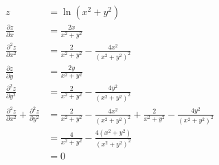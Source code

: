 \documentclass{article}
\begin{document}
\begin{align*}
  z                                                                     & = \ln (x^2 + y^2)                                                                                       \\
  \frac{\partial z}{\partial x}                                         & = \frac{2 x}{x^2 + y^2}                                                                                 \\
  \frac{\partial^2 z}{\partial x^2}                                     & = \frac{2}{x^2 + y^2} - \frac{4 x^2}{(x^2 + y^2)^2}                                                     \\
  \frac{\partial z}{\partial y}                                         & = \frac{2 y}{x^2 + y^2}                                                                                 \\
  \frac{\partial^2 z}{\partial y^2}                                     & = \frac{2}{x^2 + y^2} - \frac{4 y^2}{(x^2 + y^2)^2}                                                     \\
  \frac{\partial^2 z}{\partial x^2} + \frac{\partial^2 z}{\partial y^2} & = \frac{2}{x^2 + y^2} - \frac{4 x^2}{(x^2 + y^2)^2} + \frac{2}{x^2 + y^2} - \frac{4 y^2}{(x^2 + y^2)^2} \\
                                                                        & = \frac{4}{x^2 + y^2} - \frac{4 (x^2 + y^2)}{(x^2 + y^2)^2}                                             \\
                                                                        & = 0
\end{align*}

\setcounter{subsubsection}{38}
\subsubsection{}
\end{document}
